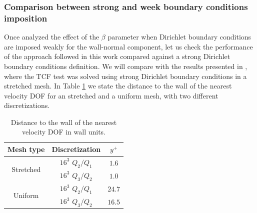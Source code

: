 \subsubsection{Comparison between strong and week boundary conditions imposition}
Once analyzed the effect of the $ \beta $ parameter when Dirichlet boundary conditions are imposed weakly for the wall-normal component, let us check the performance of the approach followed in this work compared against a strong Dirichlet boundary conditions definition. We will compare with the results presented in \cite{colomes_mixed_2015}, where the TCF test was solved using strong Dirichlet boundary conditions in a stretched mesh. In Table \ref{tab-y_plus} we state the distance to the wall of the nearest velocity DOF for an stretched and a uniform mesh, with two different discretizations.
\begin{table}[h]
\caption{Distance to the wall of the nearest velocity DOF in wall units.}
\label{tab-y_plus}
\centering
\begin{tabular}{ccc}
\toprule
Mesh type&Discretization&$ y^+ $\\
\midrule
\midrule
\multirow{2}{*}{Stretched}&$ 16^3 $ $ Q_2/Q_1 $&$ 1.6 $\\
&$ 16^3 $ $ Q_3/Q_2 $&$ 1.0 $\\
\midrule
\multirow{2}{*}{Uniform}&$ 16^3 $ $ Q_2/Q_1 $&$ 24.7 $\\
&$ 16^3 $ $ Q_3/Q_2 $&$ 16.5 $\\
\bottomrule
\end{tabular}
\end{table}

